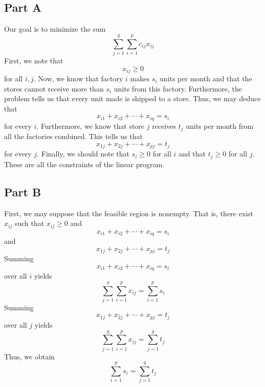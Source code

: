 \documentclass[12pt]{article}
\begin{document}
\subsection*{Part A}
Our goal is to minimize the sum
\[
\sum_{j=1}^q \sum_{i=1}^p c_{ij} x_{ij}
\] First, we note that
\[
x_{ij} \geq 0
\] for all $i,j$. Now, we know that factory $i$ makes $s_i$ units per month and that the stores cannot receive more than $s_i$ units from this factory. Furthermore, the problem tells us that every unit made is shipped to a store. Thus, we may deduce that
\[
x_{i1} + x_{i2} + \cdots + x_{iq} = s_i
\] for every $i$. Furthermore, we know that store $j$ receives $t_j$ units per month from all the factories combined. This tells us that
\[
x_{1j} + x_{2j} + \cdots + x_{pj} = t_j
\] for every $j$. Finally, we should note that $s_i \geq 0$ for all $i$ and that $t_j \geq 0$ for all $j$. These are all the constraints of the linear program. 
\newpage
\subsection*{Part B}
First, we may suppose that the feasible region is nonempty. That is, there exist $x_{ij}$ such that $x_{ij} \geq 0$ and
\[
x_{i1} + x_{i2} + \cdots + x_{iq} = s_i
\] and
\[
x_{1j} + x_{2j} + \cdots + x_{pj} = t_j
\] Summing
\[ 
x_{i1} + x_{i2} + \cdots + x_{iq} = s_i
\] over all $i$ yields
\[
\sum_{j=1}^q \sum_{i=1}^p x_{ij} =  \sum_{i=1}^p s_i
\] Summing 
\[
x_{1j} + x_{2j} + \cdots + x_{pj} = t_j
\] over all $j$ yields
\[
\sum_{j=1}^q \sum_{i=1}^p x_{ij} = \sum_{j=1}^q t_j
\] Thus, we obtain
\[
 \sum_{i=1}^p s_i = \sum_{j=1}^q t_j
\]
\end{document}
